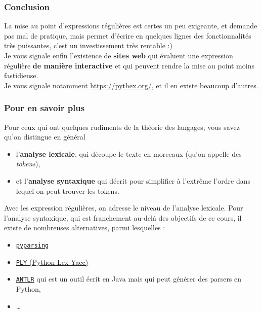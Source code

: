     \hypertarget{conclusion}{%
\subsubsection{Conclusion}\label{conclusion}}

    La mise au point d'expressions régulières est certes un peu exigeante,
et demande pas mal de pratique, mais permet d'écrire en quelques lignes
des fonctionnalités très puissantes, c'est un investissement très
rentable :)\\

    Je vous signale enfin l'existence de \textbf{sites web} qui évaluent une
expression régulière \textbf{de manière interactive} et qui peuvent
rendre la mise au point moins fastidieuse.\\

Je vous signale notamment \href{https://pythex.org/}{https://pythex.org/}, et il en existe beaucoup
d'autres.

    \hypertarget{pour-en-savoir-plus}{%
\subsubsection{Pour en savoir plus}\label{pour-en-savoir-plus}}

    Pour ceux qui ont quelques rudiments de la théorie des langages, vous
savez qu'on distingue en général

\begin{itemize}
	\item 
	l'\textbf{analyse lexicale}, qui
	découpe le texte en morceaux (qu'on appelle des \emph{tokens}),
	\item
	et l'\textbf{analyse syntaxique} qui décrit pour simplifier à l'extrême
	l'ordre dans lequel on peut trouver les tokens.
\end{itemize}

Avec les expression régulières, on adresse le niveau de l'analyse
lexicale. Pour l'analyse syntaxique, qui est franchement au-delà des
objectifs de ce cours, il existe de nombreuses alternatives, parmi
lesquelles :

\begin{itemize}
	\item 
	\href{http://pyparsing.wikispaces.com/Download+and+Installation}{\texttt{pyparsing}}
	\item
	\href{http://www.dabeaz.com/ply/}{\texttt{PLY} (Python Lex-Yacc)}
	\item
	\href{http://www.antlr.org}{\texttt{ANTLR}} qui est un outil écrit en
	Java mais qui peut générer des parsers en Python,
	\item
	\ldots{}
\end{itemize}